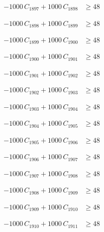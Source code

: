 \documentclass[a4paper,11pt]{article}
\begin{document}
\begin{align}
-1000\,C_{1897} + 1000\,C_{1898} &\geq 48 \nonumber
\end{align}

\begin{align}
-1000\,C_{1898} + 1000\,C_{1899} &\geq 48 \nonumber
\end{align}

\begin{align}
-1000\,C_{1899} + 1000\,C_{1900} &\geq 48 \nonumber
\end{align}

\begin{align}
-1000\,C_{1900} + 1000\,C_{1901} &\geq 48 \nonumber
\end{align}

\begin{align}
-1000\,C_{1901} + 1000\,C_{1902} &\geq 48 \nonumber
\end{align}

\begin{align}
-1000\,C_{1902} + 1000\,C_{1903} &\geq 48 \nonumber
\end{align}

\begin{align}
-1000\,C_{1903} + 1000\,C_{1904} &\geq 48 \nonumber
\end{align}

\begin{align}
-1000\,C_{1904} + 1000\,C_{1905} &\geq 48 \nonumber
\end{align}

\begin{align}
-1000\,C_{1905} + 1000\,C_{1906} &\geq 48 \nonumber
\end{align}

\begin{align}
-1000\,C_{1906} + 1000\,C_{1907} &\geq 48 \nonumber
\end{align}

\begin{align}
-1000\,C_{1907} + 1000\,C_{1908} &\geq 48 \nonumber
\end{align}

\begin{align}
-1000\,C_{1908} + 1000\,C_{1909} &\geq 48 \nonumber
\end{align}

\begin{align}
-1000\,C_{1909} + 1000\,C_{1910} &\geq 48 \nonumber
\end{align}

\begin{align}
-1000\,C_{1910} + 1000\,C_{1911} &\geq 48 \nonumber
\end{align}
\end{document}
